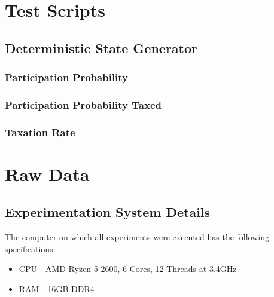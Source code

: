 \appendix





\chapter{Test Scripts}

\section{Deterministic State Generator}

\subsection{Participation Probability} \label{appendix:testparticipationprobability}



\subsection{Participation Probability Taxed} \label{appendix:testparticipationprobabilitytaxed}



\subsection{Taxation Rate} \label{appendix:testparticipationtax}



\chapter{Raw Data}

\section{Experimentation System Details} \label{appendix:computerspecs}

The computer on which all experiments were executed has the following specifications:

\begin{itemize}
    \item CPU - AMD Ryzen 5 2600, 6 Cores, 12 Threads at 3.4GHz
    \item RAM - 16GB DDR4
\end{itemize}

